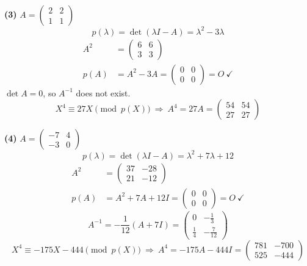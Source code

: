 \noindent\textbf{(3)} $A=\begin{pmatrix}2 & 2 \\ 1 & 1\end{pmatrix}$
\[ p(\lambda)=\det(\lambda I-A)=\lambda^{2} - 3 \lambda \]
\begin{align*}
A^2&=\begin{pmatrix}6 & 6 \\ 3 & 3\end{pmatrix} \\
p(A)&=A^{2} - 3A=\begin{pmatrix}0 & 0 \\ 0 & 0\end{pmatrix}=O\ \checkmark
\end{align*}
$\det A=0$, so $A^{-1}$ does not exist.
\[ X^4\equiv 27 X\pmod{p(X)}\ \Rightarrow\ A^4=27A=\begin{pmatrix}54 & 54 \\ 27 & 27\end{pmatrix} \]

\noindent\textbf{(4)} $A=\begin{pmatrix}-7 & 4 \\ -3 & 0\end{pmatrix}$
\[ p(\lambda)=\det(\lambda I-A)=\lambda^{2} + 7 \lambda + 12 \]
\begin{align*}
A^2&=\begin{pmatrix}37 & -28 \\ 21 & -12\end{pmatrix} \\
p(A)&=A^{2} + 7A + 12I=\begin{pmatrix}0 & 0 \\ 0 & 0\end{pmatrix}=O\ \checkmark
\end{align*}
\[ A^{-1}=-\frac{1}{12}\left(A +7I\right)=\begin{pmatrix}0 & - \frac{1}{3} \\ \frac{1}{4} & - \frac{7}{12}\end{pmatrix} \]
\[ X^4\equiv - 175 X - 444\pmod{p(X)}\ \Rightarrow\ A^4=-175A - 444I=\begin{pmatrix}781 & -700 \\ 525 & -444\end{pmatrix} \]

